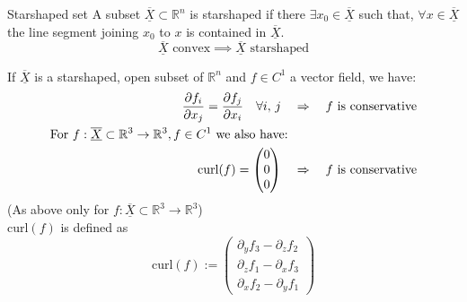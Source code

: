 \documentclass[a4paper,fontsize = 10pt]{article}
\def\R{\mathbb{R}}
\def\X{\underline{\overline{X}}}
\begin{document}
\begin{subbox}{Starshaped set}
  A subset \(\X \subset \R^n\) is starshaped if there \(\exists x_0 \in \X\) such that, \(\forall x \in \X\) the line segment joining \(x_0\) to \(x\) is contained in \(\X\). 
  \[\X \text{ convex} \implies \X \text{ starshaped}\]
\end{subbox}
If \(\X\) is a starshaped, open subset of \(\R^n\) and \(f \in C^1\) a vector field, we have:
\begin{align*}
    \pdv{f_i}{x_j} = \pdv{f_j}{x_i} \quad \forall i,\, j
  \quad &\Rightarrow \quad \text{$f$ is conservative}\\
  \text{For $f: \X \subset \R^3 \to \R^3, f \in C^1$ we also have: }\\
  \text{curl}(f) = \begin{pmatrix}
    0\\0\\0
  \end{pmatrix}
  \quad &\Rightarrow \quad \text{$f$ is conservative}
\end{align*}
(As above only for $f: \X \subset \R^3 \to \R^3$) 
\\\(\text{curl}(f)\) is defined as
\[\text{curl}(f) := \begin{pmatrix}
  \partial_y f_3 - \partial_z f_2 \\
  \partial_z f_1 - \partial_x f_3 \\
  \partial_x f_2 - \partial_y f_1
\end{pmatrix}\]
\end{document}
